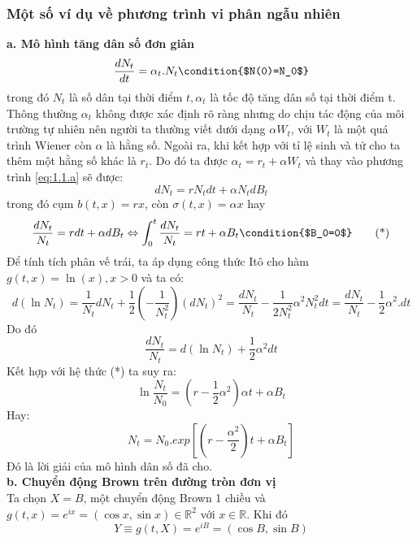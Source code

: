 \documentclass[14pt,a4paper]{article}
\numberwithin{equation}{section}
\begin{document}
\subsubsection{Một số ví dụ về phương trình vi phân ngẫu nhiên}
\textbf{a. Mô hình tăng dân số đơn giản}
\begin{equation}\label{eq:1.1.a}
	\dfrac{dN_t}{dt}=\alpha_t.N_t \condition{$N(0)=N_0$}
\end{equation}
trong đó $N_t$ là số dân tại thời điểm $t,\alpha_t$ là tốc độ tăng dân số tại thời điểm t. Thông thường $\alpha_t$ không được xác định rõ ràng nhưng do chịu tác động của môi trường tự nhiên nên người ta thường viết dưới dạng $\alpha W_t$, với $W_t$ là một quá trình Wiener còn $\alpha$ là hằng số. Ngoài ra, khi kết hợp với tỉ lệ sinh và tử cho ta thêm một hằng số khác là $r_t$. Do đó ta được $\alpha_t=r_t+\alpha W_t$ và thay vào phương trình \eqref{eq:1.1.a} sẽ được:
\begin{equation*}
	dN_t=rN_tdt+\alpha N_tdB_t
\end{equation*}
trong đó cụm $b(t,x)=rx$, còn $\sigma(t,x)=\alpha x$ hay
\begin{equation*}
	\dfrac{dN_t}{N_t}=rdt+\alpha dB_t\Leftrightarrow\int_0^t\dfrac{dN_t}{N_t}=rt+\alpha B_t \condition{$B_0=0$}\tag{*}
\end{equation*}
Để tính tích phân vế trái, ta áp dụng công thức Itô cho hàm $g(t,x)=\ln(x),x>0$ và ta có:
\begin{dmath*}
	d(\ln N_t)=\dfrac{1}{N_t}dN_t+\dfrac{1}{2}(-\dfrac{1}{N_t^2})(dN_t)^2=\dfrac{dN_t}{N_t}-\dfrac{1}{2N_t^2}\alpha^2N_t^2dt=\dfrac{dN_t}{N_t}-\dfrac{1}{2}\alpha^2.dt
\end{dmath*}
Do đó
\begin{equation*}
	\dfrac{dN_t}{N_t}=d(\ln N_t)+\dfrac{1}{2}\alpha^2dt
\end{equation*}
Kết hợp với hệ thức (*) ta suy ra:
\begin{equation*}
	\ln\dfrac{N_t}{N_0}=(r-\dfrac{1}{2}\alpha^2)\alpha t+\alpha B_t
\end{equation*}
Hay:
\begin{equation*}
	N_t=N_0.exp[(r-\dfrac{\alpha^2}{2})t+\alpha B_t]
\end{equation*}
Đó là lời giải của mô hình dân số đã cho.\\
\textbf{b. Chuyển động Brown trên đường tròn đơn vị}\\
Ta chọn $X=B$, một chuyển động Brown 1 chiều và $g(t,x)=e^{ix}=(\cos{x},\sin{x})\in\mathbb{R}^2$ với $x\in\mathbb{R}$. Khi đó
\begin{equation*}
	Y\equiv g(t,X)=e^{iB}=(\cos{B},\sin{B})
\end{equation*} 
\end{document}

